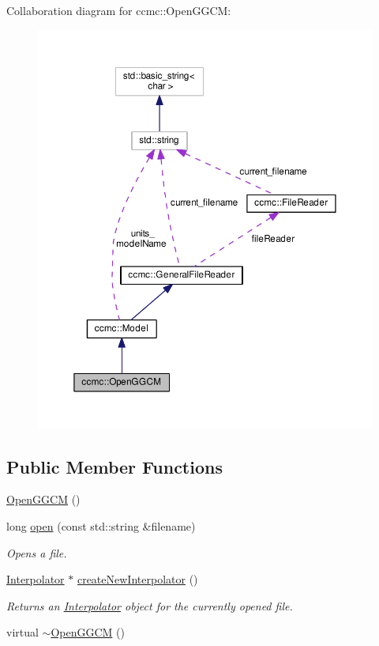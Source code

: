 Collaboration diagram for ccmc\-:\-:Open\-G\-G\-C\-M\-:
\nopagebreak
\begin{figure}[H]
\begin{center}
\leavevmode
\includegraphics[width=350pt]{classccmc_1_1_open_g_g_c_m__coll__graph}
\end{center}
\end{figure}
\subsection*{Public Member Functions}
\begin{DoxyCompactItemize}
\item 
\hyperlink{classccmc_1_1_open_g_g_c_m_a715c1d53f3f1a7f86335cf1d4a0f2d49}{Open\-G\-G\-C\-M} ()
\item 
long \hyperlink{classccmc_1_1_open_g_g_c_m_a899907309758135dbabc0d3c7b465900}{open} (const std\-::string \&filename)
\begin{DoxyCompactList}\small\item\em Opens a file.  \end{DoxyCompactList}\item 
\hyperlink{classccmc_1_1_interpolator}{Interpolator} $\ast$ \hyperlink{classccmc_1_1_open_g_g_c_m_acb2b4bd259e7dbe3d0cce0f3261408fc}{create\-New\-Interpolator} ()
\begin{DoxyCompactList}\small\item\em Returns an \hyperlink{classccmc_1_1_interpolator}{Interpolator} object for the currently opened file.  \end{DoxyCompactList}\item 
virtual \hyperlink{classccmc_1_1_open_g_g_c_m_a840e4170a8d7dc3794bda848021168a4}{$\sim$\-Open\-G\-G\-C\-M} ()
\end{DoxyCompactItemize}
